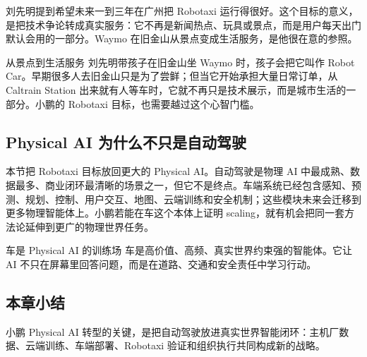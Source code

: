 刘先明提到希望未来一到三年在广州把 Robotaxi 运行得很好。这个目标的意义，是把技术争论转成真实服务：它不再是新闻热点、玩具或景点，而是用户每天出门默认会用的一部分。Waymo 在旧金山从景点变成生活服务，是他很在意的参照。

\begin{knowledgebox}{从景点到生活服务}
刘先明带孩子在旧金山坐 Waymo 时，孩子会把它叫作 Robot Car。早期很多人去旧金山只是为了尝鲜；但当它开始承担大量日常订单，从 Caltrain Station 出来就有人等车时，它就不再只是技术展示，而是城市生活的一部分。小鹏的 Robotaxi 目标，也需要越过这个心智门槛。
\end{knowledgebox}

\subsection{Physical AI 为什么不只是自动驾驶}

本节把 Robotaxi 目标放回更大的 Physical AI。自动驾驶是物理 AI 中最成熟、数据最多、商业闭环最清晰的场景之一，但它不是终点。车端系统已经包含感知、预测、规划、控制、用户交互、地图、云端训练和安全机制；这些模块未来会迁移到更多物理智能体上。小鹏若能在车这个本体上证明 scaling，就有机会把同一套方法论延伸到更广的物理世界任务。

\begin{importantbox}{车是 Physical AI 的训练场}
车是高价值、高频、真实世界约束强的智能体。它让 AI 不只在屏幕里回答问题，而是在道路、交通和安全责任中学习行动。
\end{importantbox}

\subsection{本章小结}

小鹏 Physical AI 转型的关键，是把自动驾驶放进真实世界智能闭环：主机厂数据、云端训练、车端部署、Robotaxi 验证和组织执行共同构成新的战略。

